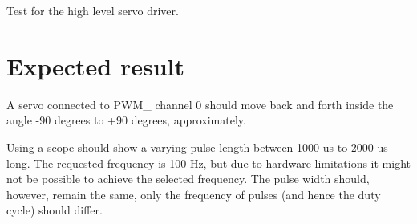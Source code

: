 Test for the high level servo driver.

\section*{Expected result }

A servo connected to {\ttfamily P\+W\+M\+\_} channel 0 should move back and forth inside the angle -\/90 degrees to +90 degrees, approximately.

Using a scope should show a varying pulse length between 1000 us to 2000 us long. The requested frequency is 100 Hz, but due to hardware limitations it might not be possible to achieve the selected frequency. The pulse width should, however, remain the same, only the frequency of pulses (and hence the duty cycle) should differ. 